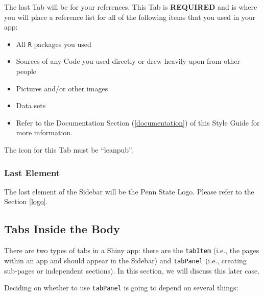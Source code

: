 \documentclass[
]{book}
\providecommand{\tightlist}{%
  \setlength{\itemsep}{0pt}\setlength{\parskip}{0pt}}
\begin{document}
The last Tab will be for your references. This Tab is \textbf{REQUIRED} and is where you will place a reference list for all of the following items that you used in your app:

\begin{itemize}
\tightlist
\item
  All \texttt{R} packages you used
\item
  Sources of any Code you used directly or drew heavily upon from other people
\item
  Pictures and/or other images
\item
  Data sets
\item
  Refer to the Documentation Section (\ref{documentation}) of this Style Guide for more information.
\end{itemize}

The icon for this Tab must be ``leanpub''.

\hypertarget{last-element}{%
\subsubsection{Last Element}\label{last-element}}

The last element of the Sidebar will be the Penn State Logo. Please refer to the Section \ref{logo}.

\hypertarget{tabs-inside-the-body}{%
\subsection{Tabs Inside the Body}\label{tabs-inside-the-body}}

There are two types of tabs in a Shiny app: there are the \texttt{tabItem} (i.e., the pages within an app and should appear in the Sidebar) and \texttt{tabPanel} (i.e., creating sub-pages or independent sections). In this section, we will discuss this later case.

Deciding on whether to use \texttt{tabPanel} is going to depend on several things:
\end{document}
